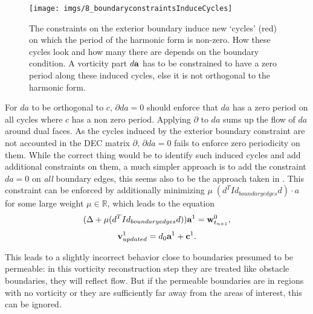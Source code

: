 \begin{figure}[t]%
\begin{center}
\texttt{[image: imgs/8\_boundaryconstraintsInduceCycles]}%
\end{center}
\caption{The constraints on the exterior boundary induce new `cycles' (red) on which the period of the harmonic form is non-zero. How these cycles look and how many there are depends on the boundary condition. A vorticity part $d\textbf{a}$ has to be constrained to have a zero period along these induced cycles, else it is not orthogonal to the harmonic form.}%
\label{fig:fd_boundaryinducedCycles}%
\end{figure}

For $da$ to be orthogonal to $c$, $\partial d a = 0$ should enforce that $da$ has a zero period on all cycles where $c$ has a non zero period. Applying $\partial$ to $da$ sums up the flow of $da$ around dual faces. As the cycles induced by the exterior boundary constraint are not accounted in the DEC matrix $\partial$, $\partial d a = 0$ fails to enforce zero periodicity on them. While the correct thing would be to identify such induced cycles and add additional constraints on them, a much simpler approach is to add the constraint $da = 0$ on \emph{all} boundary edges, this seems also to be the approach taken in \cite{simplicialFluids}. This constraint can be enforced by additionally minimizing $\mu\; (d^TId_{boundaryedges} d)\cdot a$ for some large weight $\mu \in \mathbb R$, which leads to the equation
\begin{equation}(\Delta + \mu(d^T Id_{boundaryedges} d)) \textbf{a}^1 = \textbf{w}^0_{t_{n+1}},\end{equation}
\begin{equation}\textbf{v}^1_{updated} =  d_0 \textbf{a}^1 + \textbf{c}^1.\end{equation}

This leads to a slightly incorrect behavior close to boundaries presumed to be permeable: in this vorticity reconstruction step they are treated like obstacle boundaries, they will reflect flow. But if the permeable boundaries are in regions with no vorticity or they are sufficiently far away from the areas of interest, this can be ignored.


